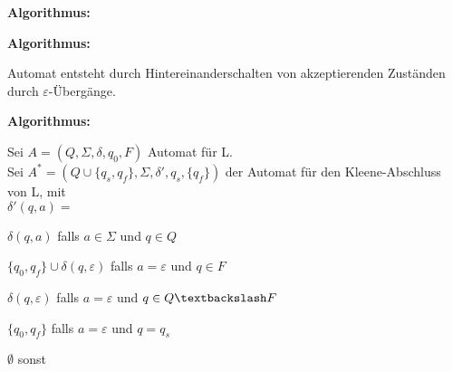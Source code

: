 \documentclass[11pt,
			a4paper,
			parskip=full,
			toc=bib,
			toc=idx,
			toc=listof,
			ngerman
			listof=totoc,]{scrartcl}
\newcommand{\ergaenzen}[1]{%
	\tt{%
		\textbf{%
				\textcolor{red}{#1}%
		}%
	}%
	\rm%
}
\newcommand{\concept}[1]{%
	\sf{%
		\textbf{%
				\textcolor{mymauve}{#1}%
		}%
	}%
	\rm%
}
\newenvironment{algo}[1]%
{	\begin{framed}
	\textbf{Algorithmus:} \concept{#1}}%
{\end{framed}}
\newcommand{\compress}{\vspace{-1em}}
\begin{document}
\begin{algo}{Kombination endlicher Automaten}
\begin{algo}{Konkatenation}
\compress
Automat entsteht durch Hintereinanderschalten von akzeptierenden Zuständen durch $ε$-Übergänge.
\end{algo}

\compress
\compress
\begin{algo}{Kleene-Abschluss} 

\compress
Sei $A=(Q,Σ,δ,q_{0},F)$ Automat für L.\\
Sei $A^*=(Q ∪ \{q_s,q_f\},Σ,δ',q_s,\{q_f\})$ der Automat für den Kleene-Abschluss von L, mit \\
$δ'(q,a) =$ 

\compress 
\begin{compactitem}
  \item $δ(q,a)$ 		falls $a \in Σ$ und $q \in Q$
  \item $\{q_0,q_f\} ∪ δ(q,ε)$ 	falls $a = ε$ und $q \in F$
  \item $δ(q,ε)$				falls $a = ε$ und $q \in Q \textbackslash F$
  \item $\{q_0,q_f\}$			falls $a = ε$ und $q = q_s$
  \item $∅$					sonst
\end{compactitem}
\end{algo}


\end{algo}





\end{document}

